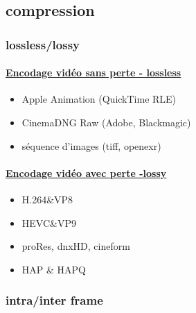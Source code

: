 \documentclass[
]{book}
\providecommand{\tightlist}{%
  \setlength{\itemsep}{0pt}\setlength{\parskip}{0pt}}
\begin{document}
\hypertarget{compression}{%
\subsection{compression}\label{compression}}

\hypertarget{losslesslossy}{%
\subsubsection{lossless/lossy}\label{losslesslossy}}

\hypertarget{encodage-viduxe9o-sans-perte---lossless}{%
\paragraph{\texorpdfstring{\href{https://en.wikipedia.org/wiki/List_of_codecs\#Lossless_video_compression}{Encodage vidéo sans perte - lossless}}{Encodage vidéo sans perte - lossless}}\label{encodage-viduxe9o-sans-perte---lossless}}

\begin{itemize}
\tightlist
\item
  Apple Animation (QuickTime RLE)
\item
  CinemaDNG Raw (Adobe, Blackmagic)
\item
  séquence d'images (tiff, openexr)
\end{itemize}

\hypertarget{encodage-viduxe9o-avec-perte--lossy}{%
\paragraph{\texorpdfstring{\href{https://en.wikipedia.org/wiki/List_of_codecs\#Lossy_compression_2}{Encodage vidéo avec perte -lossy}}{Encodage vidéo avec perte -lossy}}\label{encodage-viduxe9o-avec-perte--lossy}}

\begin{itemize}
\tightlist
\item
  H.264\&VP8
\item
  HEVC\&VP9
\item
  proRes, dnxHD, cineform\\
\item
  HAP \& HAPQ
\end{itemize}

\hypertarget{intrainter-frame}{%
\subsubsection{intra/inter frame}\label{intrainter-frame}}
\end{document}

